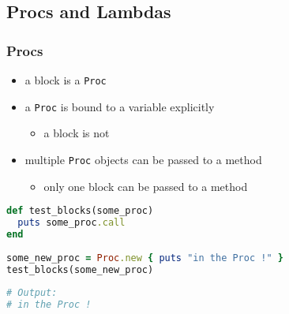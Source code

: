 \subsection{Procs and Lambdas}
\begin{frame}[fragile]\frametitle{Procs}

\begin{itemize}

\item a block is a \texttt{Proc}
\item a \texttt{Proc} is bound to a variable explicitly
\begin{itemize}
\item a block is not
\end{itemize}
\item multiple \texttt{Proc} objects can be passed to a method
\begin{itemize}
\item only one block can be passed to a method
\end{itemize}

\end{itemize}
\pause

\begin{lstlisting}[language=ruby]
def test_blocks(some_proc)
  puts some_proc.call
end
 
some_new_proc = Proc.new { puts "in the Proc !" }
test_blocks(some_new_proc)
 
# Output:
# in the Proc !
\end{lstlisting}

\end{frame}


